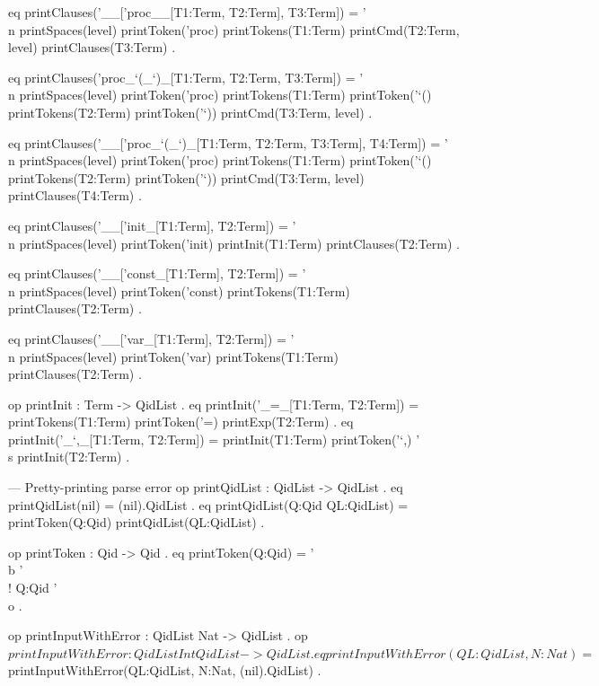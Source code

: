 \documentclass{llncs}%
\begin{document}
    eq printClauses('__['proc__[T1:Term, T2:Term], T3:Term]) =
           '\\n printSpaces(level) printToken('proc) printTokens(T1:Term)
       printCmd(T2:Term, level)
       printClauses(T3:Term) .

    eq printClauses('proc_`(_`)_[T1:Term, T2:Term, T3:Term]) =
           '\\n printSpaces(level)
       printToken('proc) printTokens(T1:Term)
           printToken('`() printTokens(T2:Term) printToken('`))
       printCmd(T3:Term, level) .

    eq printClauses('__['proc_`(_`)_[T1:Term, T2:Term, T3:Term], T4:Term]) =
           '\\n printSpaces(level) printToken('proc) printTokens(T1:Term) printToken('`()
       printTokens(T2:Term) printToken('`)) printCmd(T3:Term, level)
       printClauses(T4:Term) .

    eq printClauses('__['init_[T1:Term], T2:Term]) =
           '\\n printSpaces(level) printToken('init) printInit(T1:Term) printClauses(T2:Term) .

    eq printClauses('__['const_[T1:Term], T2:Term]) =
           '\\n printSpaces(level) printToken('const) printTokens(T1:Term) printClauses(T2:Term) .

    eq printClauses('__['var_[T1:Term], T2:Term]) =
           '\\n printSpaces(level) printToken('var) printTokens(T1:Term) printClauses(T2:Term) .

    op printInit : Term -> QidList .
        eq printInit('_=_[T1:Term, T2:Term]) =
           printTokens(T1:Term) printToken('=) printExp(T2:Term) .
    eq printInit('_`,_[T1:Term, T2:Term]) =
           printInit(T1:Term) printToken('`,) '\\s printInit(T2:Term) .

    --- Pretty-printing parse error
    op printQidList : QidList -> QidList .
    eq printQidList(nil) = (nil).QidList .
    eq printQidList(Q:Qid QL:QidList) = printToken(Q:Qid) printQidList(QL:QidList) .

    op printToken : Qid -> Qid .
    eq printToken(Q:Qid) = '\\b '\\! Q:Qid '\\o .

    op printInputWithError : QidList Nat -> QidList .
    op $printInputWithError : QidList Int QidList -> QidList .
    eq printInputWithError(QL:QidList, N:Nat) =
           $printInputWithError(QL:QidList, N:Nat, (nil).QidList) .
\end{document}
